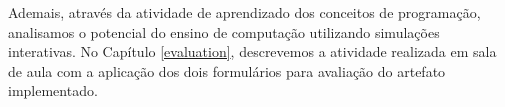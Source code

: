 


Ademais, através da atividade de aprendizado dos conceitos de programação, analisamos o potencial do ensino de computação utilizando simulações interativas. No Capítulo \ref{evaluation}, descrevemos a atividade realizada em sala de aula com a aplicação dos dois formulários para avaliação do artefato implementado.


